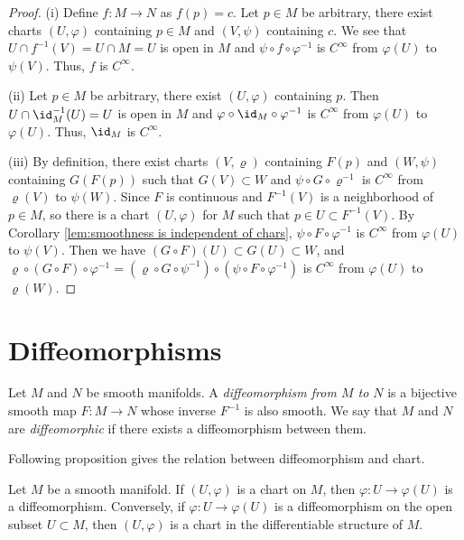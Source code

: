 \begin{proof}
    (i) Define $f : M \to N$ as $f(p) = c$. Let $p \in M$ be arbitrary, there exist charts $(U, \varphi)$ containing $p \in M$ and $(V, \psi)$ containing $c$. We see that $U \cap f^{-1}(V) = U \cap M = U$ is open in $M$ and $\psi \circ f \circ\varphi^{-1}$ is $C^\infty$ from $\varphi(U)$ to $\psi(V)$. Thus, $f$ is $C^\infty$.

    (ii) Let $p \in M$ be arbitrary, there exist $(U, \varphi)$ containing $p$. Then $U \cap \id_M^{-1}(U) = U$ is open in $M$ and $\varphi \circ \id_M \circ \varphi^{-1}$ is $C^\infty$ from $\varphi(U)$ to $\varphi(U)$. Thus, $\id_M$ is $C^\infty$.

    (iii) By definition, there exist charts $(V, \varrho)$ containing $F(p)$ and $(W, \psi)$ containing $G(F(p))$ such that $G(V) \subset W$ and $\psi \circ G \circ \varrho^{-1}$ is $C^\infty$ from $\varrho(V)$ to $\psi(W)$. Since $F$ is continuous and $F^{-1}(V)$ is a neighborhood of $p \in M$, so there is a chart $(U, \varphi)$ for $M$ such that $p \in U \subset F^{-1}(V)$. By Corollary \ref{lem:smoothness is independent of chars}, $\psi \circ F \circ \varphi^{-1}$ is $C^\infty$ from $\varphi(U)$ to $\psi(V)$. Then we have $(G \circ F)(U) \subset G(U) \subset W$, and $\varrho \circ (G \circ F) \circ \varphi^{-1} = (\varrho \circ G \circ \psi^{-1}) \circ (\psi \circ F \circ \varphi^{-1})$ is $C^\infty$ from $\varphi(U)$ to $\varrho(W)$.
\end{proof}

\section{Diffeomorphisms}

\begin{definition}[Diffeomorphism]
    Let $M$ and $N$ be smooth manifolds. A \emph{diffeomorphism from $M$ to $N$} is a bijective smooth map $F : M \to N$ whose inverse $F^{-1}$ is also smooth. We say that $M$ and $N$ are \emph{diffeomorphic} if there exists a diffeomorphism between them.
\end{definition}

Following proposition gives the relation between diffeomorphism and chart.

\begin{proposition}\label{lem:chart map is diffeomorphism}
    Let $M$ be a smooth manifold. If $(U, \varphi)$ is a chart on $M$, then $\varphi : U \to \varphi(U)$ is a diffeomorphism. Conversely, if $\varphi : U \to \varphi(U)$ is a diffeomorphism on the open subset $U \subset M$, then $(U, \varphi)$ is a chart in the differentiable structure of $M$.
\end{proposition}

